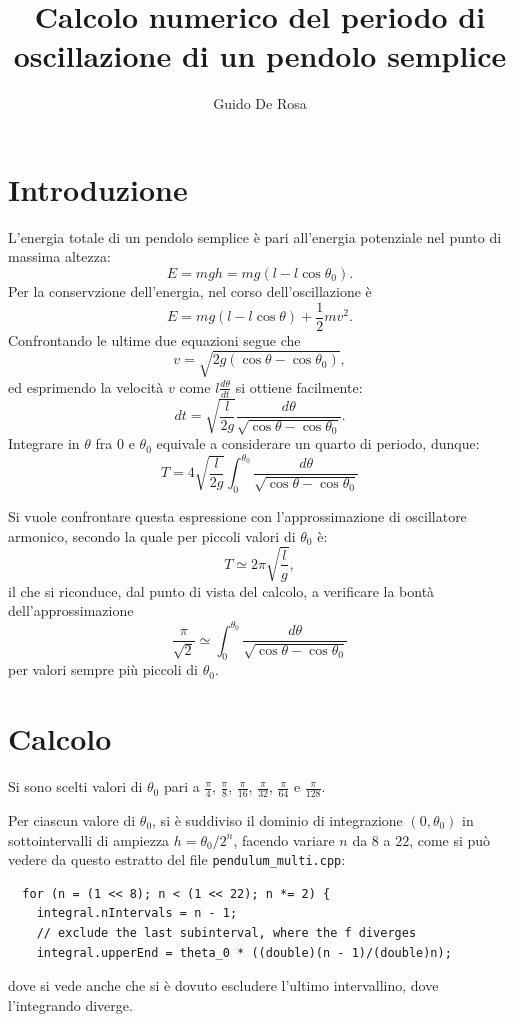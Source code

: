 \documentclass[a4paper]{article}
\author{Guido De Rosa}
\begin{document}
\title{Calcolo numerico del periodo di oscillazione di un pendolo semplice}

\maketitle

\section{Introduzione}

L'energia totale di un pendolo semplice è pari all'energia potenziale
nel punto di massima altezza:
\begin{equation*}
  E = mgh = mg(l - l\cos{\theta_0}) .
\end{equation*}
Per la conservzione dell'energia, nel corso dell'oscillazione è 
\[
  E = mg(l - l\cos{\theta}) + \frac{1}{2}mv^2 . 
\]
Confrontando le ultime due equazioni segue che
\[
  v = \sqrt{2g(\cos{\theta} - \cos{\theta_0})} ,
\] 
ed esprimendo la velocità $v$ come $l\frac{d\theta}{dt}$ si ottiene facilmente:
\[
  dt = \sqrt{\frac{l}{2g}}\frac{d\theta}{\sqrt{\cos{\theta} - \cos{\theta_0} }} .
\]
Integrare in $\theta$ fra $0$ e $\theta_0$ equivale a considerare un quarto di periodo, 
dunque:
\[
  T = 4 \sqrt{\frac{l}{2g}} \int_{0}^{\theta_0}\frac{d\theta}{\sqrt{\cos{\theta}-\cos{\theta_0}}}
\]

Si vuole confrontare questa espressione con l'approssimazione di oscillatore armonico, 
secondo la quale per piccoli valori di $\theta_0$ è:
\[
  T \simeq 2\pi \sqrt{\frac{l}{g}} ,
\]
il che si riconduce, dal punto di vista del calcolo, a verificare la bontà 
dell'approssimazione
\[
  \frac{\pi}{\sqrt{2}} \simeq \int_{0}^{\theta_0}\frac{d\theta}{\sqrt{\cos{\theta}-\cos{\theta_0}}}
\]
per valori sempre più piccoli di $\theta_0$.

\section{Calcolo}
Si sono scelti valori di $\theta_0$ pari a $\frac{\pi}{4}$, $\frac{\pi}{8}$,
$\frac{\pi}{16}$, $\frac{\pi}{32}$, $\frac{\pi}{64}$ e $\frac{\pi}{128}$.  

Per ciascun valore di $\theta_0$, si è suddiviso il dominio di integrazione 
$(0, \theta_0)$ in sottointervalli
di ampiezza $h = \theta_0/2^{n}$, facendo variare $n$ da $8$ a $22$, come si può
vedere da questo estratto del file \texttt{pendulum\_multi.cpp}:
\begin{lstlisting} 
  for (n = (1 << 8); n < (1 << 22); n *= 2) {
    integral.nIntervals = n - 1;
    // exclude the last subinterval, where the f diverges
    integral.upperEnd = theta_0 * ((double)(n - 1)/(double)n);
\end{lstlisting}
dove si vede anche che si è dovuto escludere l'ultimo intervallino, dove 
l'integrando diverge.
\end{document}
